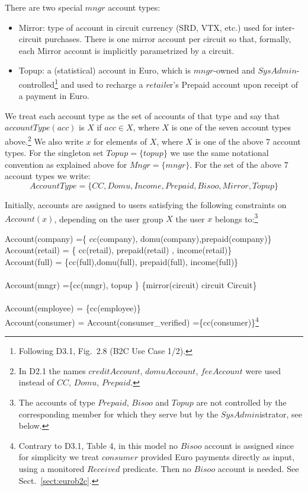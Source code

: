 There are two special $mngr$ account types:
\begin{itemize}
	\item Mirror: type of account in circuit currency (SRD, VTX, etc.) used for inter-circuit purchases. There is one mirror account per circuit so that, formally, each Mirror account is implicitly parametrized by a circuit.	
	\item Topup: a (statistical) account in Euro, which is $mngr$-owned and $SysAdmin$-controlled\footnote{Following D3.1, Fig.\ 2.8 (B2C Use Case 1/2).}  and used to recharge a $retail$er's Prepaid account upon receipt of a payment in Euro.
\end{itemize}

We treat each account type as the set of accounts of that type and say that $accountType(acc)$ is $X$ if $acc \in X$, where $X$ is one of the seven account types above.\footnote{In D2.1 the names $creditAccount$, $domuAccount$, $feeAccount$ were used instead of $CC$, $Domu$, $Prepaid$.} We also write $x$ for elements of $X$, where $X$ is one of the above 7 account types. For the singleton set $Topup=\{topup\}$ we use the same notational convention as explained above for $Mngr=\{mngr\}$. For the set of the above 7 account types we write:
\[AccountType=\{CC,Domu,Income,Prepaid,Bisoo,Mirror,Topup\} \]

Initially, accounts are assigned to users satisfying the following constraints on $Account(x)$, depending on the user group $X$ the user $x$ belongs to:\footnote{The accounts of type $Prepaid$, $Bisoo$ and $Topup$ are not controlled by the corresponding member for which they serve but by the $SysAdmin$istrator, see below.
}

\begin{asm}
Account(company) =\{ cc(company), domu(company),prepaid(company)\}  \\
Account(retail) = \{ cc(retail), prepaid(retail) , income(retail)\}\\
Account(full) =
\{cc(full),domu(full), prepaid(full), income(full)\}\\ 
\\
 Account(mngr) =\{cc(mngr), topup \} \cup 
    \{mirror(circuit) \mid circuit \in Circuit\}\\
\\
Account(employee) = \{cc(employee)\}\\
Account(consumer) = Account(consumer\_verified)              
              =\{cc(consumer)\}\footnote{Contrary to D3.1, Table 4, in this model no $Bisoo$ account is assigned since for simplicity we treat $consumer$ provided Euro payments directly as input, using a monitored $Received$ predicate. Then no $Bisoo$ account is needed. See Sect.~\ref{sect:eurob2c}.}
\end{asm}

